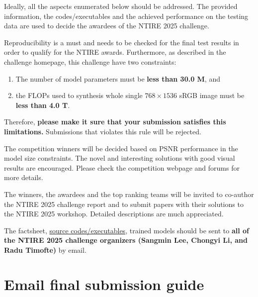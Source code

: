 \documentclass[10pt,twocolumn,letterpaper]{article}
\begin{document}
Ideally, all the aspects enumerated below should be addressed.
The provided information, the codes/executables and the achieved performance on the testing data are used to decide the awardees of the NTIRE 2025 challenge. 

Reproducibility is a must and needs to be checked for the final test results in order to qualify for the NTIRE awards. Furthermore, as described in the challenge homepage, this challenge have two constraints: 
\begin{enumerate}
    \item The number of model parameters must be \textbf{less than 30.0 M}, and
    \item the FLOPs used to synthesis whole single $768 \times 1536$ sRGB image must be \textbf{less than 4.0 T}.
\end{enumerate}
 Therefore, \textbf{please make it sure that your submission satisfies this limitations.}
 Submissions that violates this rule will be rejected.
 
The competition winners will be decided based on PSNR performance in the model size constraints. The novel and interesting solutions with good visual results are encouraged. Please check the competition webpage and forums for more details.

The winners, the awardees and the top ranking teams will be invited to co-author the NTIRE 2025 challenge report and to submit papers with their solutions to the NTIRE 2025 workshop. Detailed descriptions are much appreciated.

The factsheet, \href{https://github.com/Eve-ctr/RawFusion}{source codes/executables}, trained models should be sent to \textbf{all of the NTIRE 2025 challenge organizers (Sangmin Lee,  Chongyi Li, and Radu Timofte)} by email.


\section{Email final submission guide}

\begin{center}
\end{center}
\end{document}
